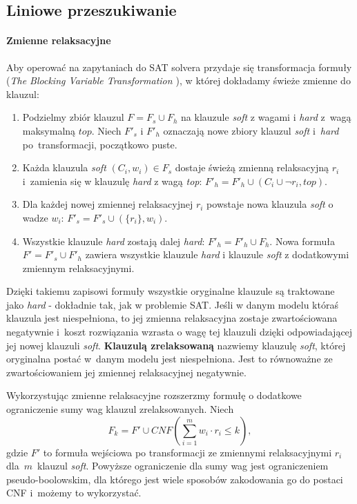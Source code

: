 \documentclass[shortabstract]{iithesis}
\begin{document}
\subsection{Liniowe przeszukiwanie}
\paragraph{Zmienne relaksacyjne}
Aby operować na zapytaniach do SAT solvera przydaje się transformacja formuły 
(\textit{The Blocking Variable Transformation \cite{chapter24}}), w której dokładamy świeże zmienne do klauzul: 
\begin{enumerate}
	\item Podzielmy zbiór klauzul $F = F_s \cup F_h$ na klauzule \textit{soft} z wagami i \textit{hard} z~wagą maksymalną $top$. Niech $F'_s$ i $F'_h$ oznaczają nowe zbiory klauzul \textit{soft} i~\textit{hard} po~transformacji, początkowo puste.
	\item Każda klauzula \textit{soft} $(C_i, w_i) \in F_s$ dostaje świeżą zmienną relaksacyjną $r_i$ i~zamienia się w klauzulę \textit{hard} z wagą \textit{top}: $F'_h = F'_h \cup {(C_i \cup \neg r_i, top)}$.
	\item Dla każdej nowej zmiennej relaksacyjnej $r_i$ powstaje nowa klauzula \textit{soft} o wadze $w_i$: $F'_s = F'_s \cup (\{r_i\}, w_i)$.
	\item Wszystkie klauzule \textit{hard} zostają dalej \textit{hard}: $F'_h = F'_h \cup F_h$. Nowa formuła $F' = F'_s \cup F'_h$ zawiera wszystkie klauzule \textit{hard} i klauzule \textit{soft} z dodatkowymi zmiennym relaksacyjnymi.
\end{enumerate}
Dzięki takiemu zapisowi formuły wszystkie oryginalne klauzule są traktowane jako \textit{hard} - dokładnie tak, jak w problemie SAT. Jeśli w danym modelu któraś klauzula jest niespełniona, to jej zmienna relaksacyjna zostaje zwartościowana negatywnie i~koszt rozwiązania wzrasta o wagę tej klauzuli dzięki odpowiadającej jej nowej klauzuli \textit{soft}.
\textbf{Klauzulą zrelaksowaną} nazwiemy klauzulę \textit{soft}, której oryginalna postać w~danym modelu jest niespełniona. Jest to równoważne ze zwartościowaniem jej zmiennej relaksacyjnej negatywnie.

Wykorzystując zmienne relaksacyjne rozszerzmy formułę o dodatkowe ograniczenie sumy wag klauzul zrelaksowanych. 
Niech $$F_k = F' \cup CNF({\sum_{i = 1}^{m} w_i \cdot r_i} \le k),$$ gdzie $F'$ to formuła wejściowa po transformacji ze zmiennymi relaksacyjnymi $r_i$ dla~$m$~klauzul \textit{soft}. 
Powyższe ograniczenie dla sumy wag jest ograniczeniem pseudo-boolowskim, dla którego jest wiele sposobów zakodowania go do postaci CNF \cite{encodings} i~możemy to wykorzystać.
\end{document}
